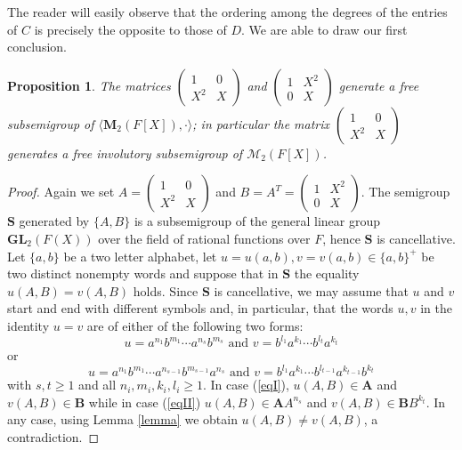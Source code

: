\documentclass[11pt,reqno]{amsart}
\newtheorem{Prop}[Thm]{Proposition}
\theoremstyle{remark}
\begin{document}
The reader will easily observe that the ordering among the degrees
of the entries of $C$ is precisely the opposite to those of $D$.
We are able to draw our first conclusion.
\begin{Prop}\label{freesubsemigroup} The matrices
$\left(\begin{smallmatrix} 1 &0\\ X^2 & X\end{smallmatrix}\right)$
and $\left(\begin{smallmatrix} 1 &X^2\\ 0 &
X\end{smallmatrix}\right)$ generate a free subsemigroup of $\langle
\mathbf{M}_2(F[X]),\cdot\rangle$; in particular the matrix $\left(\begin{smallmatrix} 1 &0\\ X^2 &
X\end{smallmatrix}\right)$ generates a free involutory subsemigroup of
$\mathcal{M}_2(F[X])$.
\end{Prop}
\begin{proof} Again we set $A=\left(\begin{smallmatrix} 1 &0\\ X^2 &
X\end{smallmatrix}\right)$ and $B=A^T=\left(\begin{smallmatrix} 1 &X^2\\
0 & X\end{smallmatrix}\right)$. The semigroup $\mathbf{S}$ generated by $\{A,B\}$ is a
subsemigroup of the general linear group $\mathbf{GL}_2(F(X))$ over the field of rational
functions over $F$, hence $\mathbf{S}$ is cancellative. Let $\{a,b\}$ be a two letter alphabet,
 let $u=u(a,b),v=v(a,b)\in\{a,b\}^+$ be two distinct nonempty words and suppose that in $\mathbf{S}$ the equality
$u(A,B)=v(A,B)$ holds. Since $\mathbf{S}$ is cancellative, we may assume that $u$ and $v$ start and end
with different symbols and, in particular, that the words $u,v$ in the identity $u=v$ are of either
of the following two forms:
\begin{equation}\label{eqI}
u=a^{n_1}b^{m_1}\cdots a^{n_s}b^{m_s}\mbox{ and }v=b^{l_1}a^{k_1}\cdots b^{l_t}a^{k_t}
\end{equation}
or
\begin{equation}\label{eqII}
 u=a^{n_1}b^{m_1}\cdots a^{n_{s-1}}b^{m_{s-1}}a^{n_s}\mbox{ and }v=b^{l_1}a^{k_1}\cdots b^{l_{t-1}}a^{k_{t-1}}b^{k_t}
 \end{equation}
with $s,t\ge 1$ and all $n_i,m_i,k_i,l_i\ge 1$. In case (\ref{eqI}), $u(A,B)\in \mathbf{A}$ and $v(A,B)\in
\mathbf{B}$ while in case (\ref{eqII}) $u(A,B)\in \mathbf{A}A^{n_s}$ and $v(A,B)\in\mathbf{B}B^{k_t}$.
In any case, using Lemma \ref{lemma} we obtain $u(A,B)\ne v(A,B)$, a contradiction.
\end{proof}
\end{document}
